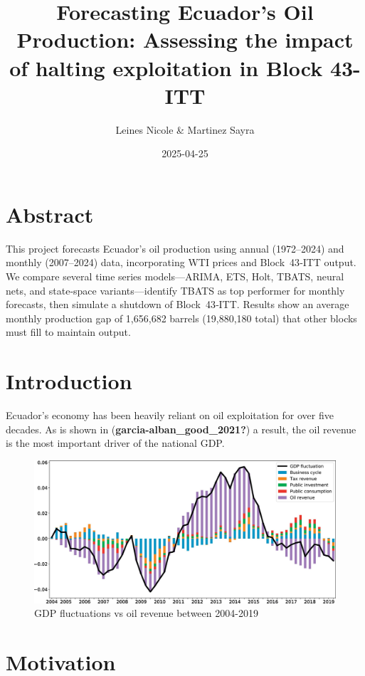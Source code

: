 \documentclass[
]{article}
\title{Forecasting Ecuador's Oil Production: Assessing the impact of
halting exploitation in Block 43-ITT}
\author{Leines Nicole \& Martinez Sayra}
\date{2025-04-25}
\begin{document}
\maketitle

\section{Abstract}\label{abstract}

This project forecasts Ecuador's oil production using annual
(1972--2024) and monthly (2007--2024) data, incorporating WTI prices and
Block~43‑ITT output. We compare several time series models---ARIMA, ETS,
Holt, TBATS, neural nets, and state‐space variants---identify TBATS as
top performer for monthly forecasts, then simulate a shutdown of
Block~43‑ITT. Results show an average monthly production gap of
1,656,682 barrels (19,880,180 total) that other blocks must fill to
maintain output.

\section{Introduction}\label{introduction}

Ecuador's economy has been heavily reliant on oil exploitation for over
five decades. As is shown in (\textbf{garcia-alban\_good\_2021?}) a
result, the oil revenue is the most important driver of the national
GDP.

\begin{figure}
\centering
\includegraphics{images/Image1.png.jpg}
\caption{GDP fluctuations vs oil revenue between 2004-2019}
\end{figure}

\section{Motivation}\label{motivation}
\end{document}

